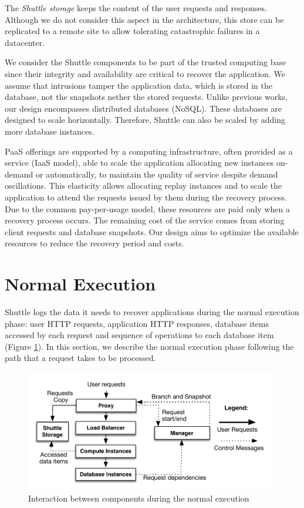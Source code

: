 The \emph{Shuttle storage} keeps the content of the user requests and responses. Although we do not consider this aspect in the architecture, this store can be replicated to a remote site to allow tolerating catastrophic failures in a datacenter.


We consider the Shuttle components to be part of the trusted computing base since their integrity and availability are critical to recover the application. We assume that intrusions tamper the application data, which is stored in the database, not the snapshots nether the stored requests. 
Unlike previous works, our design encompasses distributed databases (\acs{NoSQL}). These databases are designed to scale horizontally. Therefore, Shuttle can also be scaled by adding more database instances.

PaaS offerings are supported by a computing infrastructure, often provided as a service (IaaS model), able to scale the application allocating new instances on-demand or automatically, to maintain the quality of service despite demand oscillations. This elasticity  allows allocating replay instances and to scale the application to attend the requests issued by them during the recovery process. Due to the common pay-per-usage model, these resources are paid only when a recovery process occurs. The remaining cost of the service comes from storing client requests and database snapshots. Our design aims to optimize the available resources to reduce the recovery period and costs. 


\section{Normal Execution}
\label{sec:arch:normal_execution}
Shuttle logs the data it needs to recover applications during the normal execution phase: user \ac{HTTP} requests, application \ac{HTTP} responses, database items accessed by each request and sequence of operations to each database item (Figure \ref{fig:normal_execution}). In this section, we describe the normal execution phase following the path that a request takes to be processed.

\begin{figure}
\centering
\includegraphics[width=110mm]{images/normalExecution}
\caption{Interaction between components during the normal execution}
\label{fig:normal_execution}
\end{figure}

